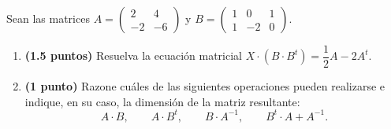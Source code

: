 
Sean las matrices
$A=\begin{pmatrix}2&4\\-2&-6\end{pmatrix}$ y
$B=\begin{pmatrix}1&0&1\\1&-2&0\end{pmatrix}$.
\begin{enumerate}[label=\alph*)]
\item \textbf{(1.5 puntos)} Resuelva la ecuación matricial $X\cdot(B\cdot B^t)=\dfrac{1}{2}A-2A^t$.
\item \textbf{(1 punto)} Razone cuáles de las siguientes operaciones pueden realizarse e indique, en su caso, la dimensión de la matriz resultante:
\[
A\cdot B,\qquad A\cdot B^t,\qquad B\cdot A^{-1},\qquad B^t\cdot A+A^{-1}.
\]
\end{enumerate}
